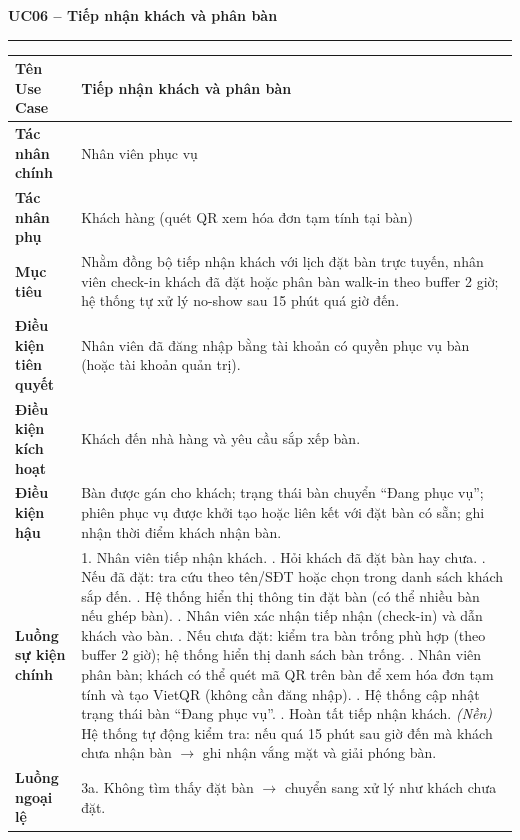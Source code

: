 ﻿\documentclass[../DoAn.tex]{subfiles}
\newcommand{\UCtitle}[1]{%
    \vspace{0.5em}
    {\large\bfseries #1}\\[-0.5em]
    \rule{\textwidth}{0.5pt}
    \vspace{0.3em}
}
\begin{document}
\begin{table}[H]
\UCtitle{UC06 – Tiếp nhận khách và phân bàn}
\centering
\small
\begin{tabular}{|p{3.5cm}|p{10.7cm}|}
\hline
\textbf{Tên Use Case} & Tiếp nhận khách và phân bàn \\ \hline
\textbf{Tác nhân chính} & Nhân viên phục vụ \\ \hline
\textbf{Tác nhân phụ} & Khách hàng (quét QR xem hóa đơn tạm tính tại bàn) \\ \hline
\textbf{Mục tiêu} &
Nhằm đồng bộ tiếp nhận khách với lịch đặt bàn trực tuyến, nhân viên check-in khách đã đặt hoặc phân bàn walk-in theo buffer 2 giờ; hệ thống tự xử lý no-show sau 15 phút quá giờ đến.
\\ \hline
\textbf{Điều kiện tiên quyết} & Nhân viên đã đăng nhập bằng tài khoản có quyền phục vụ bàn (hoặc tài khoản quản trị). \\ \hline
\textbf{Điều kiện kích hoạt} & Khách đến nhà hàng và yêu cầu sắp xếp bàn. \\ \hline
\textbf{Điều kiện hậu} &
Bàn được gán cho khách; trạng thái bàn chuyển ``Đang phục vụ''; phiên phục vụ được khởi tạo hoặc liên kết với đặt bàn có sẵn; ghi nhận thời điểm khách nhận bàn.
\\ \hline
\textbf{Luồng sự kiện chính} &
1. Nhân viên tiếp nhận khách. \newline
2. Hỏi khách đã đặt bàn hay chưa. \newline
3. Nếu đã đặt: tra cứu theo tên/SĐT hoặc chọn trong danh sách khách sắp đến. \newline
4. Hệ thống hiển thị thông tin đặt bàn (có thể nhiều bàn nếu ghép bàn). \newline
5. Nhân viên xác nhận tiếp nhận (check-in) và dẫn khách vào bàn. \newline
6. Nếu chưa đặt: kiểm tra bàn trống phù hợp (theo buffer 2 giờ); hệ thống hiển thị danh sách bàn trống. \newline
7. Nhân viên phân bàn; khách có thể quét mã QR trên bàn để xem hóa đơn tạm tính và tạo VietQR (không cần đăng nhập). \newline
8. Hệ thống cập nhật trạng thái bàn ``Đang phục vụ''. \newline
9. Hoàn tất tiếp nhận khách. \newline
\textit{(Nền)} Hệ thống tự động kiểm tra: nếu quá 15 phút sau giờ đến mà khách chưa nhận bàn $\rightarrow$ ghi nhận vắng mặt và giải phóng bàn.
\\ \hline
\textbf{Luồng ngoại lệ} &
3a. Không tìm thấy đặt bàn $\rightarrow$ chuyển sang xử lý như khách chưa đặt. \newline

\end{tabular}
\end{table}
\end{document}

